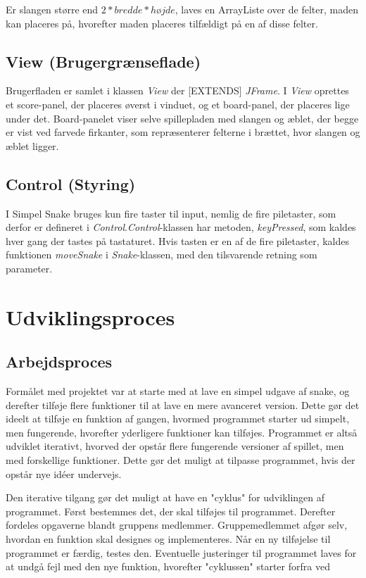 \documentclass{report}
\begin{document}
Er slangen større end $2*bredde*højde$, laves en ArrayListe over de felter, maden kan placeres på, hvorefter maden placeres tilfældigt på en af disse felter.

\subsection{View (Brugergrænseflade)}
Brugerfladen er samlet i klassen \textit{View} der [EXTENDS] \textit{JFrame}. I \textit{View} oprettes et score-panel, der placeres øverst i vinduet, og et board-panel, der placeres lige under det. Board-panelet viser selve spillepladen med slangen og æblet, der begge er vist ved farvede firkanter, som repræsenterer felterne i brættet, hvor slangen og æblet ligger.

\subsection{Control (Styring)}
I Simpel Snake bruges kun fire taster til input, nemlig de fire piletaster, som derfor er defineret i \textit{Control}.\textit{Control}-klassen har metoden, \textit{keyPressed}, som kaldes hver gang der tastes på tastaturet. Hvis tasten er en af de fire piletaster, kaldes funktionen \textit{moveSnake} i \textit{Snake}-klassen, med den tilsvarende retning som parameter.

\section{Udviklingsproces}
\subsection{Arbejdsproces}
Formålet med projektet var at starte med at lave en simpel udgave af snake, og derefter tilføje flere funktioner til at lave en mere avanceret version. Dette gør det ideelt at tilføje en funktion af gangen, hvormed programmet starter ud simpelt, men fungerende, hvorefter yderligere funktioner kan tilføjes. Programmet er altså udviklet iterativt, hvorved der opstår flere fungerende versioner af spillet, men med forskellige funktioner. Dette gør det muligt at tilpasse programmet, hvis der opstår nye idéer undervejs. 

Den iterative tilgang gør det muligt at have en "cyklus" for udviklingen af programmet. Først bestemmes det, der skal tilføjes til programmet. Derefter fordeles opgaverne blandt gruppens medlemmer. Gruppemedlemmet afgør selv, hvordan en funktion skal designes og implementeres. Når en ny tilføjelse til programmet er færdig, testes den. Eventuelle justeringer til programmet laves for at undgå fejl med den nye funktion, hvorefter "cyklussen" starter forfra ved
\end{document}

